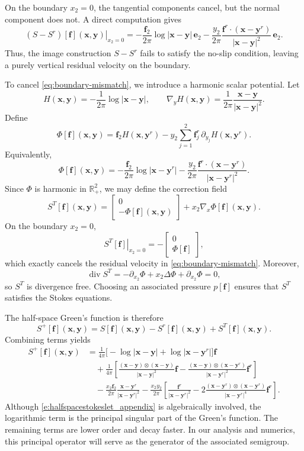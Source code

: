 \documentclass{amsart}
\newcommand{\mx}{\mathbf{x}}
\newcommand{\my}{\mathbf{y}}
\newcommand{\mf}{\mathbf{f}}
\begin{document}
 
On the boundary $x_2=0$, the tangential components cancel, but the normal
component does not. A direct computation gives
\begin{equation}\label{eq:boundary-mismatch}
\left.(S-S^r)[\mf](\mx,\my)\right|_{x_2=0}
= -\frac{\mf_2}{2\pi}\log|\mx-\my|\,\mathbf e_2
-\frac{y_2}{2\pi}
\frac{\mf^r\cdot(\mx-\my^r)}{|\mx-\my|^2}\,\mathbf e_2 .
\end{equation}
Thus, the image construction $S-S^r$ fails to satisfy the no-slip condition,
leaving a purely vertical residual velocity on the boundary.
 
 
To cancel \eqref{eq:boundary-mismatch}, we introduce a harmonic scalar
potential. Let
\[
H(\mx,\my)=-\frac{1}{2\pi}\log|\mx-\my|, \qquad
\nabla_y H(\mx,\my)=\frac{1}{2\pi}\frac{\mx-\my}{|\mx-\my|^2}.
\]
Define
\[
\Phi[\mf](\mx,\my)
= \mf_2 H(\mx,\my^r)
- y_2 \sum_{j=1}^2 \mf_j^r \,\partial_{y_j}H(\mx,\my^r).
\]
Equivalently,
\[
\Phi[\mf](\mx,\my)
= -\frac{\mf_2}{2\pi}\log|\mx-\my^r|
-\frac{y_2}{2\pi}
\frac{\mf^r\cdot(\mx-\my^r)}{|\mx-\my^r|^2}.
\]
Since $\Phi$ is harmonic in $\mathbb{R}^2_+$, we may define the correction field
\[
S^T[\mf](\mx,\my)
=
\begin{bmatrix}
0 \\ -\Phi[\mf](\mx,\my)
\end{bmatrix}
+ x_2 \nabla_x \Phi[\mf](\mx,\my).
\]
On the boundary $x_2=0$,
\[
\left.S^T[\mf]\right|_{x_2=0}
=
-\begin{bmatrix}
0 \\ \Phi[\mf]
\end{bmatrix},
\]
which exactly cancels the residual velocity in \eqref{eq:boundary-mismatch}.
Moreover,
\[
\operatorname{div} S^T
= -\partial_{x_2}\Phi + x_2 \Delta \Phi + \partial_{x_2}\Phi
= 0,
\]
so $S^T$ is divergence free. Choosing an associated pressure
$p[\mf]$ ensures that $S^T$ satisfies the Stokes equations.
 
The half-space Green’s function is therefore
\[
S^+[\mf](\mx,\my)
= S[\mf](\mx,\my) - S^r[\mf](\mx,\my) + S^T[\mf](\mx,\my).
\]
Combining terms yields
\begin{equation}\label{e:halfspacestokeslet_appendix}
\begin{split}
S^+[\mf](\mx,\my)
&= \frac{1}{4\pi}
\big[
-\log|\mx-\my|+\log|\mx-\my^r|
\big]\mf \\
&\quad + \frac{1}{4\pi}
\left[
\frac{(\mx-\my)\otimes(\mx-\my)}{|\mx-\my|^2}\mf
-\frac{(\mx-\my)\otimes(\mx-\my^r)}{|\mx-\my^r|^2}\mf^r
\right] \\
&\quad - \frac{x_2\mf_2}{2\pi}\frac{\mx-\my^r}{|\mx-\my^r|^2}
- \frac{x_2y_2}{2\pi}
\left[
\frac{\mf^r}{|\mx-\my^r|^2}
-2\frac{(\mx-\my^r)\otimes(\mx-\my^r)}{|\mx-\my^r|^4}\mf^r
\right].
\end{split}
\end{equation}
Although \eqref{e:halfspacestokeslet_appendix} is algebraically involved, the logarithmic
term is the principal singular part of the Green's function. The remaining terms
are lower order and decay faster. In our analysis and numerics, this principal
operator will serve as the generator of the associated semigroup.
 
\end{document}
